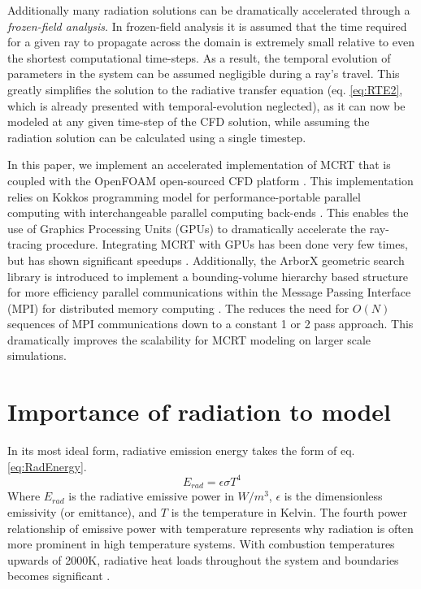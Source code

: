 Additionally many radiation solutions can be dramatically accelerated through a \textit{frozen-field analysis}. In frozen-field analysis it is assumed that the time required for a given ray to propagate across the domain is extremely small relative to even the shortest computational time-steps. 
As a result, the temporal evolution of parameters in the system can be assumed negligible during a ray's travel.
This greatly simplifies the solution to the radiative transfer equation (eq. \ref{eq:RTE2}, which is already presented with temporal-evolution neglected), as it can now be modeled at any given time-step of the CFD solution, while assuming the radiation solution can be calculated using a single timestep.

In this paper, we implement an accelerated implementation of MCRT that is coupled with the OpenFOAM open-sourced CFD platform \cite{Weller1998ATechniques}. 
This implementation relies on Kokkos programming model for performance-portable parallel computing with interchangeable parallel computing back-ends \cite{Trott2021KokkosEra}. This enables the use of Graphics Processing Units (GPUs) to dramatically accelerate the ray-tracing procedure. Integrating MCRT with GPUs has been done very few times, but has shown significant speedups \cite{Silvestri2019ASimulation,Humphrey2016RadiativeRefinement,Heymann2012GPU-basedAGN}. 
Additionally, the ArborX geometric search library is introduced to implement a bounding-volume hierarchy based structure for more efficiency parallel communications within the Message Passing Interface (MPI) for distributed memory computing \cite{Lebrun-Grandie2019ArborX:Library}. 
The  reduces the need for $O(N)$ sequences of MPI communications down to a constant 1 or 2 pass approach. This dramatically improves the scalability for MCRT modeling on larger scale simulations. 

\section{Importance of radiation to model}
In its most ideal form, radiative emission energy takes the form of eq. \ref{eq:RadEnergy}.
\begin{equation}
    E_{rad}=\epsilon{}\sigma{}T^4
    \label{eq:RadEnergy}
\end{equation}
Where $E_{rad}$ is the radiative emissive power in $W/m^3$, $\epsilon{}$ is the dimensionless emissivity (or emittance), and $T$ is the temperature in Kelvin. 
The fourth power relationship of emissive power with temperature represents why radiation is often more prominent in high temperature systems. With combustion temperatures upwards of 2000K, radiative heat loads throughout the system and boundaries becomes significant \cite{Modest2016RadiativeSystems}.

